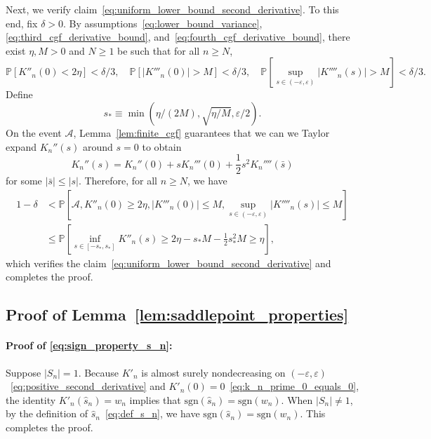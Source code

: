 \documentclass[12pt]{article}
\theoremstyle{definition}
\def\P{\mathbb{P}}
\def\P{\mathbb{P}}
\renewcommand{\P}{\mathbb{P}}							%
\begin{document}
Next, we verify claim~\eqref{eq:uniform_lower_bound_second_derivative}. To this end, fix $\delta > 0$. By assumptions~\eqref{eq:lower_bound_variance}, \eqref{eq:third_cgf_derivative_bound}, and~\eqref{eq:fourth_cgf_derivative_bound}, there exist $\eta, M > 0$ and $N \geq 1$ be such that for all $n \geq N$,
\begin{equation*}
\P[K''_n(0) < 2 \eta ] < \delta/3, \quad \P[|K'''_{n}(0)| > M] < \delta/3, \quad \P\left[\sup_{s \in (-\varepsilon, \varepsilon)}|K''''_{n}(s)| > M\right] < \delta/3. 
\end{equation*}
Define
\begin{equation*}
s_* \equiv \min(\eta/(2M), \sqrt{\eta/M}, \varepsilon/2).
\end{equation*}
On the event $\mathcal A$, Lemma~\ref{lem:finite_cgf} guarantees that we can we Taylor expand $K_n''(s)$ around $s = 0$ to obtain
\begin{equation*}
K_n''(s) = K_n''(0) + sK_n'''(0) + \frac12 s^2 K_n''''(\bar s)
\end{equation*}
for some $|\bar s|\leq |s|$. Therefore, for all $n \geq N$, we have
\begin{equation*}
\begin{split}
1-\delta &< \P\left[\mathcal A, K''_n(0) \geq 2 \eta, |K'''_{n}(0)| \leq M, \sup_{s \in (-\varepsilon, \varepsilon)}|K''''_{n}(s)| \leq M  \right] \\
&\leq \P\left[\inf_{s \in [-s_*, s_*]}K''_n(s) \geq 2\eta - s_* M - \frac12 s_*^2 M \geq \eta\right],
\end{split}
\end{equation*}
which verifies the claim~\eqref{eq:uniform_lower_bound_second_derivative} and completes the proof.

\subsection{Proof of Lemma~\ref{lem:saddlepoint_properties}}

\paragraph{Proof of \eqref{eq:sign_property_s_n}:}

Suppose $|S_n|=1$. Because $K'_n$ is almost surely nondecreasing on $(-\varepsilon, \varepsilon)$~\eqref{eq:positive_second_derivative} and $K'_n(0) = 0$~\eqref{eq:k_n_prime_0_equals_0}, the identity $K'_n(\hat s_n) = w_n$ implies that $\mathrm{sgn}(\hat s_n)=\mathrm{sgn}(w_n)$. When $|S_n|\neq 1$, by the definition of $\hat s_n$~\eqref{eq:def_s_n}, we have $\mathrm{sgn}(\hat s_n)=\mathrm{sgn}(w_n)$. This completes the proof.
\end{document}

